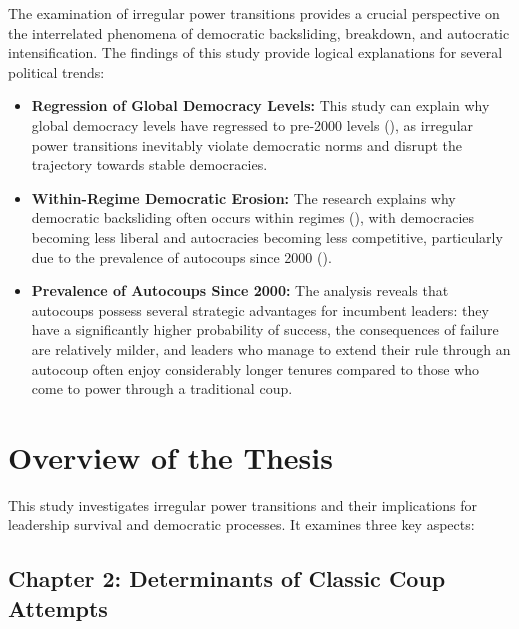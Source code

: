 \documentclass[
  12pt,
]{report}
\begin{document}
The examination of irregular power transitions provides a crucial
perspective on the interrelated phenomena of democratic backsliding,
breakdown, and autocratic intensification. The findings of this study
provide logical explanations for several political trends:

\begin{itemize}
\item
  \textbf{Regression of Global Democracy Levels:} This study can explain
  why global democracy levels have regressed to pre-2000 levels
  (), as
  irregular power transitions inevitably violate democratic norms and
  disrupt the trajectory towards stable democracies.
\item
  \textbf{Within-Regime Democratic Erosion:} The research explains why
  democratic backsliding often occurs within regimes
  (),
  with democracies becoming less liberal and autocracies becoming less
  competitive, particularly due to the prevalence of autocoups since
  2000 ().
\item
  \textbf{Prevalence of Autocoups Since 2000:} The analysis reveals that
  autocoups possess several strategic advantages for incumbent leaders:
  they have a significantly higher probability of success, the
  consequences of failure are relatively milder, and leaders who manage
  to extend their rule through an autocoup often enjoy considerably
  longer tenures compared to those who come to power through a
  traditional coup.
\end{itemize}

\section{Overview of the Thesis}\label{overview-of-the-thesis}

This study investigates irregular power transitions and their
implications for leadership survival and democratic processes. It
examines three key aspects:

\subsection*{Chapter 2: Determinants of Classic Coup
Attempts}\label{chapter-2-determinants-of-classic-coup-attempts}
\end{document}
